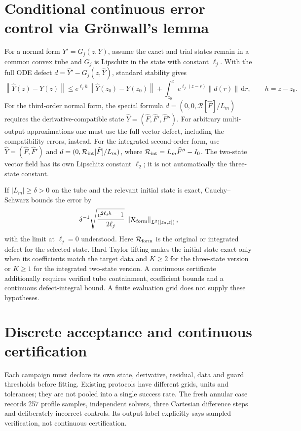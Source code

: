 \documentclass[11pt,a4paper,oneside]{report}
\numberwithin{equation}{chapter}
\newcommand{\R}{\mathcal R}
\newcommand{\dd}{\mathrm d}
\newcommand{\norm}[1]{\left\lVert#1\right\rVert}
\begin{document}
\section{Conditional continuous error control via Gr\"onwall's lemma}\label{sec:conditional-error}
For a normal form $Y'=G_j(z,Y)$, assume the exact and trial states remain
in a common convex tube and $G_j$ is Lipschitz in the state with constant
$\ell_j$. With the full ODE defect $d=\widehat Y'-G_j(z,\widehat Y)$,
standard stability \cite{teschl2012,mishra2023} gives
\begin{equation}\label{eq:gronwall}
\norm{\widehat Y(z)-Y(z)}
\le e^{\ell_j h}\norm{\widehat Y(z_0)-Y(z_0)}
+\int_{z_0}^z e^{\ell_j(z-r)}\norm{d(r)}\,\dd r,
\qquad h=z-z_0.
\end{equation}
For the third-order normal form, the special formula
$d=(0,0,\R[\widehat F]/L_m)$ requires the derivative-compatible state
$\widehat Y=(\widehat F,\widehat F',\widehat F'')$.
For arbitrary multi-output approximations one must use the full vector
defect, including the compatibility errors, instead.
For the integrated second-order form, use
$\widehat Y=(\widehat F,\widehat F')$ and
$d=(0,\R_{\rm int}[\widehat F]/L_m)$, where
$\R_{\rm int}=L_m\widehat F''-I_0$.
The two-state vector field has its own Lipschitz constant $\ell_2$;
it is not automatically the three-state constant.

If $|L_m|\ge\delta>0$ on the tube and the relevant initial state is exact,
Cauchy--Schwarz bounds the error by
\[
\delta^{-1}\sqrt{\frac{e^{2\ell_j h}-1}{2\ell_j}}\,
\norm{\R_{\rm form}}_{L^2([z_0,z])},
\]
with the limit at $\ell_j=0$ understood.
Here $\R_{\rm form}$ is the original or integrated defect for the selected
state. Hard Taylor lifting makes the initial state exact only when its
coefficients match the target data and $K\ge2$ for the three-state version
or $K\ge1$ for the integrated two-state version.
A continuous certificate additionally requires verified tube containment,
coefficient bounds and a continuous defect-integral bound.
A finite evaluation grid does not supply these hypotheses.



\section{Discrete acceptance and continuous certification}
Each campaign must declare its own state, derivative, residual, data and
guard thresholds before fitting. Existing protocols have different grids,
units and tolerances; they are not pooled into a single success rate.
The fresh annular case records 257 profile samples, independent solvers,
three Cartesian difference steps and deliberately incorrect controls.
Its output label explicitly says sampled verification, not continuous certification.
\end{document}
